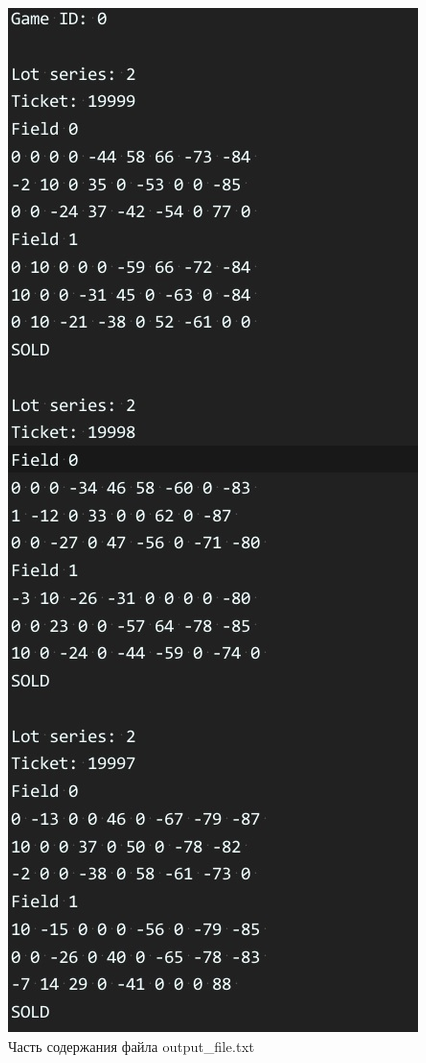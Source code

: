 \documentclass[a4paper,14pt]{article}
\begin{document}
\begin{figure}[H]
  \includegraphics{pictures/8}
  \caption{Часть содержания файла output\_file.txt}
\end{figure}
\end{document}
